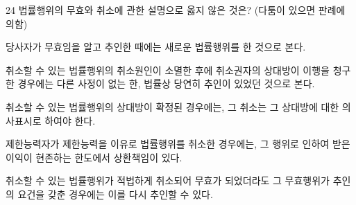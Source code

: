 \begin{question}{24}
법률행위의 무효와 취소에 관한 설명으로 옳지 않은 것은? (다툼이 있으면 판례에 의함)
\begin{choices}
  \item 당사자가 무효임을 알고 추인한 때에는 새로운 법률행위를 한 것으로 본다.
  \item 취소할 수 있는 법률행위의 취소원인이 소멸한 후에 취소권자의 상대방이 이행을 청구한 경우에는 다른 사정이 없는 한, 법률상 당연히 추인이 있었던 것으로 본다.
  \item 취소할 수 있는 법률행위의 상대방이 확정된 경우에는, 그 취소는 그 상대방에 대한 의사표시로 하여야 한다.
  \item 제한능력자가 제한능력을 이유로 법률행위를 취소한 경우에는, 그 행위로 인하여 받은 이익이 현존하는 한도에서 상환책임이 있다.
  \item 취소할 수 있는 법률행위가 적법하게 취소되어 무효가 되었더라도 그 무효행위가 추인의 요건을 갖춘 경우에는 이를 다시 추인할 수 있다.
\end{choices}
\end{question}
